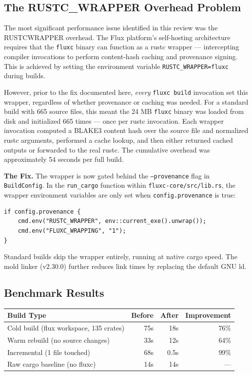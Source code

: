 \documentclass[11pt,a4paper]{article}
\begin{document}
\subsection{The RUSTC\_WRAPPER Overhead Problem}

The most significant performance issue identified in this review was the RUSTC\textunderscore WRAPPER overhead. The Flux platform's self-hosting architecture requires that the \texttt{fluxc} binary can function as a rustc wrapper — intercepting compiler invocations to perform content-hash caching and provenance signing. This is achieved by setting the environment variable \texttt{RUSTC\_WRAPPER=fluxc} during builds.

However, prior to the fix documented here, \textit{every} \texttt{fluxc build} invocation set this wrapper, regardless of whether provenance or caching was needed. For a standard build with 665 source files, this meant the 24 MB \texttt{fluxc} binary was loaded from disk and initialized 665 times — once per rustc invocation. Each wrapper invocation computed a BLAKE3 content hash over the source file and normalized rustc arguments, performed a cache lookup, and then either returned cached outputs or forwarded to the real rustc. The cumulative overhead was approximately 54 seconds per full build.

\textbf{The Fix.} The wrapper is now gated behind the \texttt{--provenance} flag in \texttt{BuildConfig}. In the \texttt{run\_cargo} function within \texttt{fluxc-core/src/lib.rs}, the wrapper environment variables are only set when \texttt{config.provenance} is true:

\begin{verbatim}
if config.provenance {
    cmd.env("RUSTC_WRAPPER", env::current_exe().unwrap());
    cmd.env("FLUXC_WRAPPING", "1");
}
\end{verbatim}

Standard builds skip the wrapper entirely, running at native cargo speed. The mold linker (v2.30.0) further reduces link times by replacing the default GNU ld.

\subsection{Benchmark Results}

\begin{center}
\begin{tabular}{lrrr}
\toprule
\textbf{Build Type} & \textbf{Before} & \textbf{After} & \textbf{Improvement} \\
\midrule
Cold build (flux workspace, 135 crates) & 75s & 18s & 76\% \\
Warm rebuild (no source changes) & 33s & 12s & 64\% \\
Incremental (1 file touched) & 68s & 0.5s & 99\% \\
Raw cargo baseline (no fluxc) & 14s & 14s & — \\
\bottomrule
\end{tabular}
\end{center}
\end{document}
